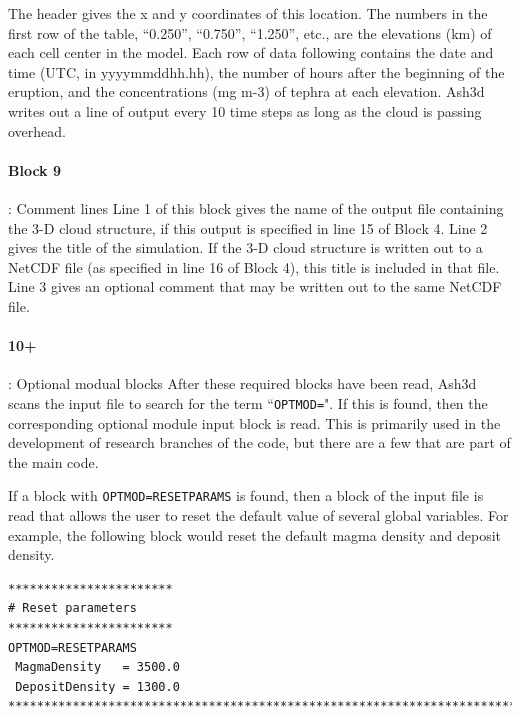 The header gives the x and y
coordinates of this location. The numbers in the first row of the table,
``0.250'', ``0.750'', ``1.250'', etc., are the elevations (km) of each cell center in the
model. Each row of data following contains the date and time (UTC, in yyyymmddhh.hh),
the number of hours after the beginning of the eruption, and the concentrations
(mg m-3) of tephra at each elevation. Ash3d writes out a line of output every 10 time
steps as long as the cloud is passing overhead.

\paragraph{Block 9}: Comment lines
Line 1 of this block gives the name of the output file containing the 3-D cloud
structure, if this output is specified in line 15 of Block 4.
Line 2 gives the title of the simulation. If the 3-D cloud structure is written
out to a NetCDF file (as specified in line 16 of Block 4), this title is included
in that file.
Line 3 gives an optional comment that may be written out to the same NetCDF file.

\paragraph{10+}: Optional modual blocks
After these required blocks have been read, Ash3d scans the input file to search
for the term ``\texttt{OPTMOD=}".  If this is found, then the corresponding optional
module input block is read.  This is primarily used in the development of
research branches of the code, but there are a few that are part of the main
code.

If a block with \texttt{OPTMOD=RESETPARAMS} is found, then a block of the input
file is read that allows the user to reset the default value of several global
variables.  For example, the following block would reset the default magma
density and deposit density.
\small
\begin{verbatim}
***********************
# Reset parameters
***********************
OPTMOD=RESETPARAMS
 MagmaDensity   = 3500.0
 DepositDensity = 1300.0
*******************************************************************************
\end{verbatim}
\normalsize

